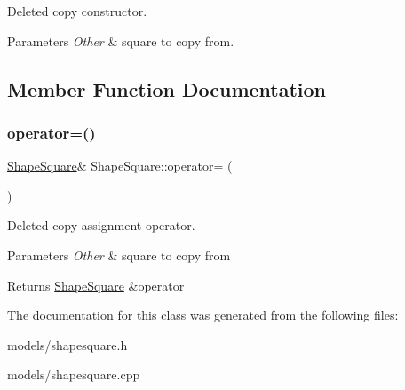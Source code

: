 Deleted copy constructor. 


\begin{DoxyParams}{Parameters}
{\em Other} & square to copy from. \\
\hline
\end{DoxyParams}


\subsection{Member Function Documentation}
\mbox{\label{class_shape_square_af1909440887eed998f5723c8511a0432}} 
\subsubsection{\texorpdfstring{operator=()}{operator=()}}
{\footnotesize\ttfamily \mbox{\hyperlink{class_shape_square}{Shape\+Square}}\& Shape\+Square\+::operator= (\begin{DoxyParamCaption}\item[{const \mbox{\hyperlink{class_shape_square}{Shape\+Square}} \&}]{ }\end{DoxyParamCaption})\hspace{0.3cm}{\ttfamily [delete]}}



Deleted copy assignment operator. 


\begin{DoxyParams}{Parameters}
{\em Other} & square to copy from \\
\hline
\end{DoxyParams}
\begin{DoxyReturn}{Returns}
\mbox{\hyperlink{class_shape_square}{Shape\+Square}} \&operator 
\end{DoxyReturn}


The documentation for this class was generated from the following files\+:\begin{DoxyCompactItemize}
\item 
models/shapesquare.\+h\item 
models/shapesquare.\+cpp\end{DoxyCompactItemize}
